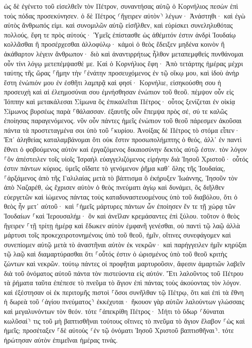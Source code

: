 \documentclass[twoside, 9pt]{extreport}
\begin{document}
ὡς δὲ ἐγένετο τοῦ εἰσελθεῖν τὸν Πέτρον, συναντήσας αὐτῷ ὁ Κορνήλιος πεσὼν ἐπὶ τοὺς πόδας προσεκύνησεν. 
ὁ δὲ Πέτρος ⸂ἤγειρεν αὐτὸν⸃ λέγων· Ἀνάστηθι· καὶ ἐγὼ αὐτὸς ἄνθρωπός εἰμι. 
καὶ συνομιλῶν αὐτῷ εἰσῆλθεν, καὶ εὑρίσκει συνεληλυθότας πολλούς, 
ἔφη τε πρὸς αὐτούς· Ὑμεῖς ἐπίστασθε ὡς ἀθέμιτόν ἐστιν ἀνδρὶ Ἰουδαίῳ κολλᾶσθαι ἢ προσέρχεσθαι ἀλλοφύλῳ· κἀμοὶ ὁ θεὸς ἔδειξεν μηδένα κοινὸν ἢ ἀκάθαρτον λέγειν ἄνθρωπον· 
διὸ καὶ ἀναντιρρήτως ἦλθον μεταπεμφθείς πυνθάνομαι οὖν τίνι λόγῳ μετεπέμψασθέ με. 
Καὶ ὁ Κορνήλιος ἔφη· Ἀπὸ τετάρτης ἡμέρας μέχρι ταύτης τῆς ὥρας ⸀ἤμην τὴν ⸀ἐνάτην προσευχόμενος ἐν τῷ οἴκῳ μου, καὶ ἰδοὺ ἀνὴρ ἔστη ἐνώπιόν μου ἐν ἐσθῆτι λαμπρᾷ 
καὶ φησί· Κορνήλιε, εἰσηκούσθη σου ἡ προσευχὴ καὶ αἱ ἐλεημοσύναι σου ἐμνήσθησαν ἐνώπιον τοῦ θεοῦ. 
πέμψον οὖν εἰς Ἰόππην καὶ μετακάλεσαι Σίμωνα ὃς ἐπικαλεῖται Πέτρος· οὗτος ξενίζεται ἐν οἰκίᾳ Σίμωνος βυρσέως παρὰ ⸀θάλασσαν. 
ἐξαυτῆς οὖν ἔπεμψα πρὸς σέ, σύ τε καλῶς ἐποίησας παραγενόμενος. νῦν οὖν πάντες ἡμεῖς ἐνώπιον τοῦ θεοῦ πάρεσμεν ἀκοῦσαι πάντα τὰ προστεταγμένα σοι ὑπὸ τοῦ ⸀κυρίου. 
Ἀνοίξας δὲ Πέτρος τὸ στόμα εἶπεν· Ἐπ᾽ ἀληθείας καταλαμβάνομαι ὅτι οὐκ ἔστιν προσωπολήμπτης ὁ θεός, 
ἀλλ᾽ ἐν παντὶ ἔθνει ὁ φοβούμενος αὐτὸν καὶ ἐργαζόμενος δικαιοσύνην δεκτὸς αὐτῷ ἐστιν. 
τὸν λόγον ⸀ὃν ἀπέστειλεν τοῖς υἱοῖς Ἰσραὴλ εὐαγγελιζόμενος εἰρήνην διὰ Ἰησοῦ Χριστοῦ· οὗτός ἐστιν πάντων κύριος. 
ὑμεῖς οἴδατε τὸ γενόμενον ῥῆμα καθ᾽ ὅλης τῆς Ἰουδαίας, ⸀ἀρξάμενος ἀπὸ τῆς Γαλιλαίας μετὰ τὸ βάπτισμα ὃ ἐκήρυξεν Ἰωάννης, 
Ἰησοῦν τὸν ἀπὸ Ναζαρέθ, ὡς ἔχρισεν αὐτὸν ὁ θεὸς πνεύματι ἁγίῳ καὶ δυνάμει, ὃς διῆλθεν εὐεργετῶν καὶ ἰώμενος πάντας τοὺς καταδυναστευομένους ὑπὸ τοῦ διαβόλου, ὅτι ὁ θεὸς ἦν μετ᾽ αὐτοῦ· 
καὶ ⸀ἡμεῖς μάρτυρες πάντων ὧν ἐποίησεν ἔν τε τῇ χώρᾳ τῶν Ἰουδαίων ⸀καὶ Ἰερουσαλήμ· ὃν καὶ ἀνεῖλαν κρεμάσαντες ἐπὶ ξύλου. 
τοῦτον ὁ θεὸς ἤγειρεν ⸀τῇ τρίτῃ ἡμέρᾳ καὶ ἔδωκεν αὐτὸν ἐμφανῆ γενέσθαι, 
οὐ παντὶ τῷ λαῷ ἀλλὰ μάρτυσι τοῖς προκεχειροτονημένοις ὑπὸ τοῦ θεοῦ, ἡμῖν, οἵτινες συνεφάγομεν καὶ συνεπίομεν αὐτῷ μετὰ τὸ ἀναστῆναι αὐτὸν ἐκ νεκρῶν· 
καὶ παρήγγειλεν ἡμῖν κηρύξαι τῷ λαῷ καὶ διαμαρτύρασθαι ὅτι ⸀οὗτός ἐστιν ὁ ὡρισμένος ὑπὸ τοῦ θεοῦ κριτὴς ζώντων καὶ νεκρῶν. 
τούτῳ πάντες οἱ προφῆται μαρτυροῦσιν, ἄφεσιν ἁμαρτιῶν λαβεῖν διὰ τοῦ ὀνόματος αὐτοῦ πάντα τὸν πιστεύοντα εἰς αὐτόν. 
Ἔτι λαλοῦντος τοῦ Πέτρου τὰ ῥήματα ταῦτα ἐπέπεσε τὸ πνεῦμα τὸ ἅγιον ἐπὶ πάντας τοὺς ἀκούοντας τὸν λόγον. 
καὶ ἐξέστησαν οἱ ἐκ περιτομῆς πιστοὶ ⸀ὅσοι συνῆλθαν τῷ Πέτρῳ, ὅτι καὶ ἐπὶ τὰ ἔθνη ἡ δωρεὰ τοῦ ⸂ἁγίου πνεύματος⸃ ἐκκέχυται· 
ἤκουον γὰρ αὐτῶν λαλούντων γλώσσαις καὶ μεγαλυνόντων τὸν θεόν. τότε ⸀ἀπεκρίθη Πέτρος· 
Μήτι τὸ ὕδωρ ⸂δύναται κωλῦσαί⸃ τις τοῦ μὴ βαπτισθῆναι τούτους οἵτινες τὸ πνεῦμα τὸ ἅγιον ἔλαβον ⸀ὡς καὶ ἡμεῖς; 
προσέταξεν ⸀δὲ αὐτοὺς ⸂ἐν τῷ ὀνόματι Ἰησοῦ Χριστοῦ βαπτισθῆναι⸃. τότε ἠρώτησαν αὐτὸν ἐπιμεῖναι ἡμέρας τινάς. 
\end{document}
